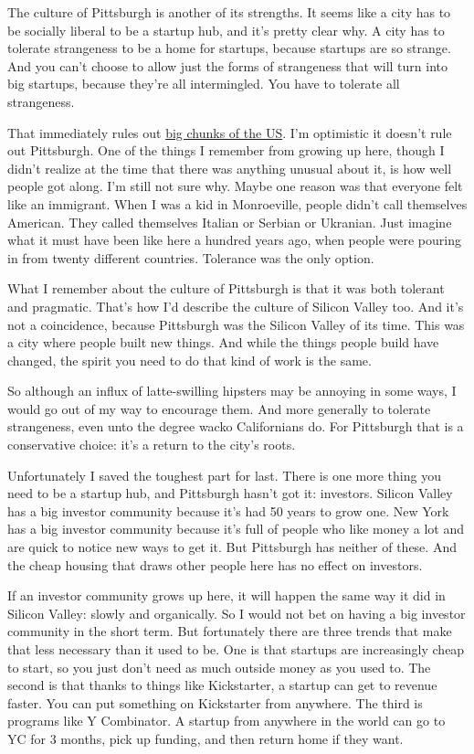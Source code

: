 The culture of Pittsburgh is another of its strengths. It seems like a
city has to be socially liberal to be a startup hub, and it's pretty
clear why. A city has to tolerate strangeness to be a home for startups,
because startups are so strange. And you can't choose to allow just the
forms of strangeness that will turn into big startups, because they're
all intermingled. You have to tolerate all strangeness.

That immediately rules out
\href{http://www.nytimes.com/2016/04/06/us/gay-rights-mississippi-north-carolina.html}{big
chunks of the US}. I'm optimistic it doesn't rule out Pittsburgh. One of
the things I remember from growing up here, though I didn't realize at
the time that there was anything unusual about it, is how well people
got along. I'm still not sure why. Maybe one reason was that everyone
felt like an immigrant. When I was a kid in Monroeville, people didn't
call themselves American. They called themselves Italian or Serbian or
Ukranian. Just imagine what it must have been like here a hundred years
ago, when people were pouring in from twenty different countries.
Tolerance was the only option.

What I remember about the culture of Pittsburgh is that it was both
tolerant and pragmatic. That's how I'd describe the culture of Silicon
Valley too. And it's not a coincidence, because Pittsburgh was the
Silicon Valley of its time. This was a city where people built new
things. And while the things people build have changed, the spirit you
need to do that kind of work is the same.

So although an influx of latte-swilling hipsters may be annoying in some
ways, I would go out of my way to encourage them. And more generally to
tolerate strangeness, even unto the degree wacko Californians do. For
Pittsburgh that is a conservative choice: it's a return to the city's
roots.

Unfortunately I saved the toughest part for last. There is one more
thing you need to be a startup hub, and Pittsburgh hasn't got it:
investors. Silicon Valley has a big investor community because it's had
50 years to grow one. New York has a big investor community because it's
full of people who like money a lot and are quick to notice new ways to
get it. But Pittsburgh has neither of these. And the cheap housing that
draws other people here has no effect on investors.

If an investor community grows up here, it will happen the same way it
did in Silicon Valley: slowly and organically. So I would not bet on
having a big investor community in the short term. But fortunately there
are three trends that make that less necessary than it used to be. One
is that startups are increasingly cheap to start, so you just don't need
as much outside money as you used to. The second is that thanks to
things like Kickstarter, a startup can get to revenue faster. You can
put something on Kickstarter from anywhere. The third is programs like Y
Combinator. A startup from anywhere in the world can go to YC for 3
months, pick up funding, and then return home if they want.

